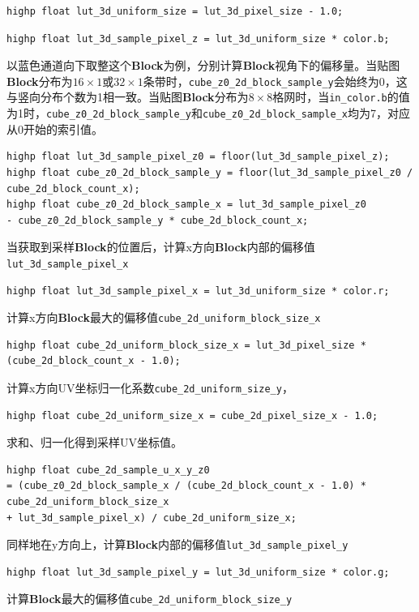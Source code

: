 \documentclass{ctexart}
\begin{document}
    \begin{verbatim}
highp float lut_3d_uniform_size = lut_3d_pixel_size - 1.0;
    \end{verbatim}
    \begin{verbatim}
highp float lut_3d_sample_pixel_z = lut_3d_uniform_size * color.b;
    \end{verbatim}
    以蓝色通道向下取整这个\textbf{Block}为例，分别计算\textbf{Block}视角下的偏移量。当贴图\textbf{Block}分布为$ 16\times1 $或$ 32\times1 $条带时，\verb|cube_z0_2d_block_sample_y|会始终为0，这与竖向分布个数为1相一致。当贴图\textbf{Block}分布为$ 8\times8 $格网时，当\verb|in_color.b|的值为1时，\verb|cube_z0_2d_block_sample_y|和\verb|cube_z0_2d_block_sample_x|均为7，对应从0开始的索引值。
    \begin{verbatim}
highp float lut_3d_sample_pixel_z0 = floor(lut_3d_sample_pixel_z);
highp float cube_z0_2d_block_sample_y = floor(lut_3d_sample_pixel_z0 / cube_2d_block_count_x);
highp float cube_z0_2d_block_sample_x = lut_3d_sample_pixel_z0 
- cube_z0_2d_block_sample_y * cube_2d_block_count_x;
    \end{verbatim}
    当获取到采样\textbf{Block}的位置后，计算x方向\textbf{Block}内部的偏移值\verb|lut_3d_sample_pixel_x|
    \begin{verbatim}
highp float lut_3d_sample_pixel_x = lut_3d_uniform_size * color.r;
    \end{verbatim}
    计算x方向\textbf{Block}最大的偏移值\verb|cube_2d_uniform_block_size_x|
    \begin{verbatim}
highp float cube_2d_uniform_block_size_x = lut_3d_pixel_size * (cube_2d_block_count_x - 1.0);
    \end{verbatim}
    计算x方向UV坐标归一化系数\verb|cube_2d_uniform_size_y|，
    \begin{verbatim}
highp float cube_2d_uniform_size_x = cube_2d_pixel_size_x - 1.0;
    \end{verbatim}
    求和、归一化得到采样UV坐标值。
    \begin{verbatim}
highp float cube_2d_sample_u_x_y_z0 
= (cube_z0_2d_block_sample_x / (cube_2d_block_count_x - 1.0) * cube_2d_uniform_block_size_x 
+ lut_3d_sample_pixel_x) / cube_2d_uniform_size_x;
    \end{verbatim}
    同样地在y方向上，计算\textbf{Block}内部的偏移值\verb|lut_3d_sample_pixel_y|
    \begin{verbatim}
highp float lut_3d_sample_pixel_y = lut_3d_uniform_size * color.g;
    \end{verbatim}
    计算\textbf{Block}最大的偏移值\verb|cube_2d_uniform_block_size_y|
\end{document}

